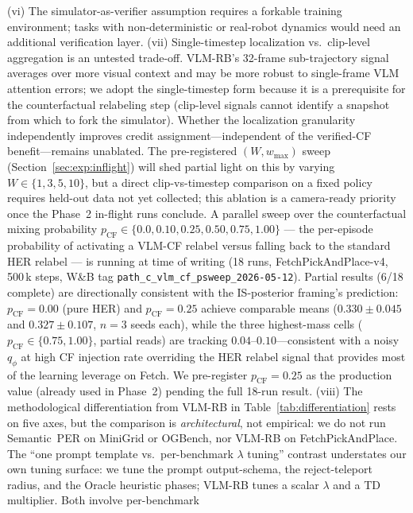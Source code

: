 \documentclass{article}
\begin{document}
(vi) The simulator-as-verifier assumption requires a forkable training environment;
tasks with non-deterministic or real-robot dynamics would need an additional
verification layer.
(vii) Single-timestep localization vs.\ clip-level aggregation is an
untested trade-off.  VLM-RB's 32-frame sub-trajectory signal averages over more
visual context and may be more robust to single-frame VLM attention errors; we
adopt the single-timestep form because it is a prerequisite for the
counterfactual relabeling step (clip-level signals cannot identify a snapshot
from which to fork the simulator).  Whether the localization granularity
independently improves credit assignment---independent of the verified-CF
benefit---remains unablated.  The pre-registered $(W, w_{\max})$ sweep
(Section~\ref{sec:exp:inflight}) will shed partial light on this by varying
$W\!\in\!\{1,3,5,10\}$, but a direct clip-vs-timestep comparison on a fixed
policy requires held-out data not yet collected; this ablation is a camera-ready
priority once the Phase~2 in-flight runs conclude.
A parallel sweep over the counterfactual mixing probability $p_{\text{CF}}\!\in\!\{0.0, 0.10, 0.25, 0.50, 0.75, 1.00\}$ --- the per-episode probability of activating a VLM-CF relabel versus falling back to the standard HER relabel --- is running at time of writing (18 runs, FetchPickAndPlace-v4, 500\,k steps, W\&B tag \texttt{path\_c\_vlm\_cf\_psweep\_2026-05-12}).
Partial results (6/18 complete) are directionally consistent with the IS-posterior framing's prediction: $p_{\text{CF}}\!=\!0.00$ (pure HER) and $p_{\text{CF}}\!=\!0.25$ achieve comparable means ($0.330 \pm 0.045$ and $0.327 \pm 0.107$, $n\!=\!3$ seeds each), while the three highest-mass cells ($p_{\text{CF}}\!\in\!\{0.75, 1.00\}$, partial reads) are tracking $0.04$--$0.10$---consistent with a noisy $q_\phi$ at high CF injection rate overriding the HER relabel signal that provides most of the learning leverage on Fetch.
We pre-register $p_{\text{CF}}\!=\!0.25$ as the production value (already used in Phase~2) pending the full 18-run result.
(viii) The methodological differentiation from VLM-RB \citep{sharony2026vlmrb}
in Table~\ref{tab:differentiation} rests on five axes, but the comparison is
\emph{architectural}, not empirical: we do not run Semantic~PER on MiniGrid or
OGBench, nor VLM-RB on FetchPickAndPlace.  The ``one prompt template vs.\ per-benchmark
$\lambda$ tuning'' contrast understates our own tuning surface: we tune the
prompt output-schema, the reject-teleport radius, and the Oracle heuristic phases;
VLM-RB tunes a scalar $\lambda$ and a TD multiplier.  Both involve per-benchmark
\end{document}
